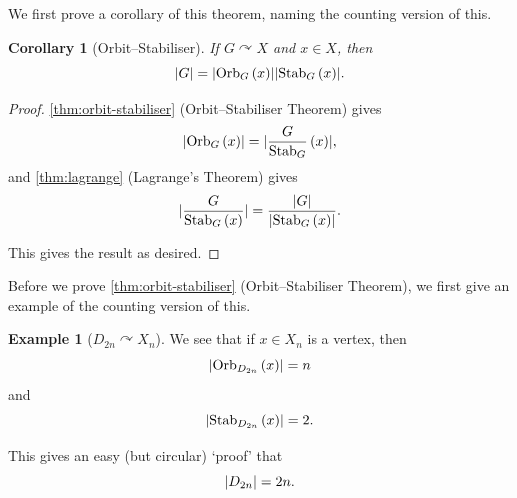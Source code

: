 \documentclass{article}
\newtheorem{corollary}[theorem]{Corollary}
\theoremstyle{definition}
\newtheorem*{example*}{Example}
\theoremstyle{remark}
\DeclarePairedDelimiter{\abs}{\lvert}{\rvert}
\newcommand{\pqty}[1]{\left(#1\right)}
\newcommand{\flatfrac}[2]{\frac{#1}{#2}}
\newcommand{\actson}{\curvearrowright}
\newcommand{\Stab}{\operatorname{Stab}}
\newcommand{\Orb}{\operatorname{Orb}}
\begin{document}
We first prove a corollary of this theorem, naming the counting version of this.

\begin{corollary}[Orbit--Stabiliser]
    \label{cor:orbit-stabiliser}%
    If \(G \actson X\) and \(x \in X\), then
    \[
        \abs{G} = \abs{\Orb_{G}\pqty{x}} \abs{\Stab_{G}\pqty{x}}.
    \]
\end{corollary}

\begin{proof}
    \autoref{thm:orbit-stabiliser} (Orbit--Stabiliser Theorem) gives
    \[
        \abs{\Orb_{G} \pqty{x}} = \abs{\flatfrac{G}{\Stab_{G}} \pqty{x}},
    \]
    and \autoref{thm:lagrange} (Lagrange's Theorem) gives
    \[
        \abs{\flatfrac{G}{\Stab_{G} \pqty{x}}} = \frac{\abs{G}}{\abs{\Stab_{G} \pqty{x}}}.
    \]

    This gives the result as desired.
\end{proof}

Before we prove \autoref{thm:orbit-stabiliser} (Orbit--Stabiliser Theorem), we first give an example of the counting version of this.

\begin{example*}[\(D_{2n} \actson X_n\)]
    We see that if \(x \in X_n\) is a vertex, then
    \[
        \abs{\Orb_{D_{2n}} \pqty{x}} = n
    \]
    and
    \[
        \abs{\Stab_{D_{2n}} \pqty{x}} = 2.
    \]

    This gives an easy (but circular) `proof' that
    \[
        \abs{D_{2n}} = 2n.
    \]
\end{example*}
\end{document}
